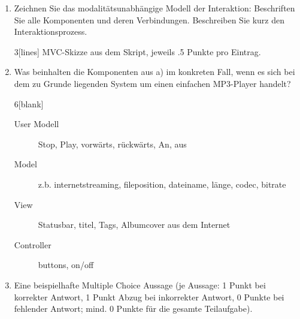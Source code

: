 	
\begin{enumerate}
\item Zeichnen Sie das modalitätsunabhängige Modell der Interaktion: Beschriften
Sie alle Komponenten und deren Verbindungen. Beschreiben Sie kurz den
Interaktionsprozess.

\begin{solution}{3}[lines]
MVC-Skizze aus dem Skript, jeweils .5 Punkte pro Eintrag.
\end{solution}

\item Was beinhalten die Komponenten aus a) im konkreten Fall, wenn es sich bei
dem zu Grunde liegenden System um einen einfachen MP3-Player handelt?

\begin{solution}{6}[blank]
\begin{description} 
\item[User Modell] Stop, Play, vorwärts, rückwärts, An, aus
\item[Model] z.b. internetstreaming, fileposition, dateiname, länge, codec,
bitrate
\item[View] Statusbar, titel, Tags, Albumcover aus dem Internet 
\item[Controller] buttons, on/off
\end{description}
\end{solution}


\item Eine beispielhafte Multiple Choice Aussage (je Aussage: 1 Punkt bei korrekter Antwort, 1 Punkt Abzug bei inkorrekter Antwort, 0 Punkte bei fehlender Antwort; mind. 0 Punkte für die gesamte Teilaufgabe).

\begin{multiplechoice}
\end{multiplechoice}

\end{enumerate}
